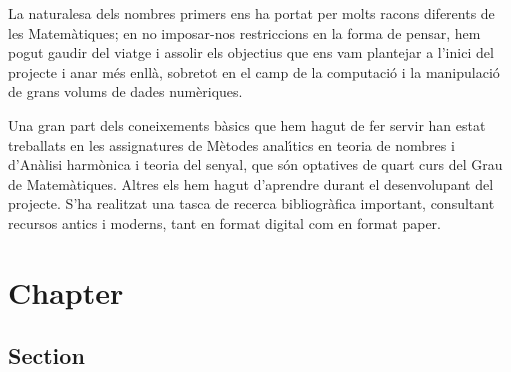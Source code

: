 \documentclass[11pt,a4paper,openright,oneside]{book}
\numberwithin{equation}{section}
\begin{document}
La naturalesa dels nombres primers ens ha portat per molts racons diferents de les Matem\`atiques; en no imposar-nos restriccions en la forma de pensar, hem pogut gaudir del viatge i assolir els objectius que ens vam plantejar a l'inici del projecte i anar m\'es enll\`a, sobretot en el camp de la computaci\'o i la manipulaci\'o de grans volums de dades num\`eriques.

Una gran part dels coneixements b\`asics que hem hagut de fer servir han estat treballats en les assignatures de M\`etodes anal\'{\i}tics en teoria de nombres i d'An\`alisi harm\`onica i teoria del senyal, que s\'on optatives de quart curs del Grau de Ma\-te\-m\`a\-ti\-ques. Altres els hem hagut d'aprendre durant el desenvolupant del projecte. S'ha realitzat una tasca de recerca bibliogr\`afica important, consultant recursos antics i moderns, tant en format digital com en format paper.

\normalfont


\newpage

\printbibliography

\appendix
\chapter{Chapter}
\section{Section}
\end{document}
